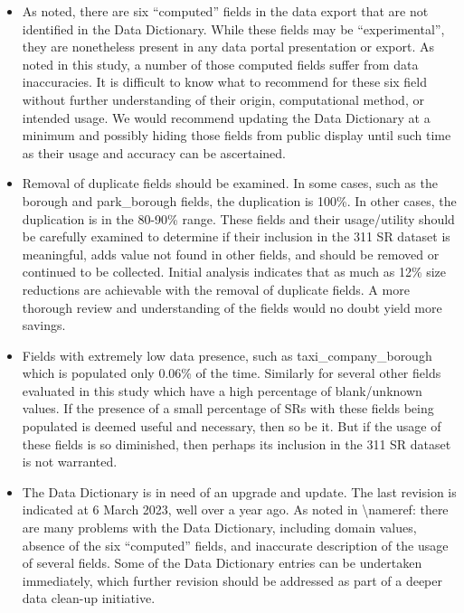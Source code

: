 \documentclass[12pt, titlepage]{article}
\begin{document}
\begin{itemize}
	\item As noted, there are six ``computed'' fields in the data export 
	that are not identified in the Data Dictionary. While these fields may 
	be ``experimental'', they are nonetheless present in any data portal 
	presentation or export. As noted in this study, a number of those 
	computed fields suffer from data inaccuracies. It is difficult to know 
	what to recommend for these six field without further understanding of 
	their origin, computational method, or intended usage. We would 
	recommend updating the Data Dictionary at a minimum and 
	possibly hiding those fields from public display until such time as 
	their usage and accuracy can be ascertained.
	
	\item Removal of duplicate fields should be examined.  In some cases, such 
	as the borough and park\_borough fields, the duplication is 100\%. In 
	other cases, the duplication is in the 80-90\% range. These fields and 
	their usage/utility should be carefully examined to determine if 
	their inclusion in the 311 SR dataset is meaningful, adds value not found 
	in other fields, and should be removed or continued to be collected. Initial 
	analysis indicates that as much as 12\% size reductions are achievable 
	with the removal of duplicate fields. A more thorough review and 
	understanding of the fields would no doubt yield more savings. 
	
	\item Fields with extremely low data presence, such as taxi\_company\_borough 
	which is populated only 0.06\% of the time. Similarly for several other 
	fields evaluated in this study which have a high percentage of blank/unknown 
	values. If the presence of a small percentage of SRs with these fields 
	being populated is deemed useful and necessary, then so be it. But if 
	the usage of these fields is so diminished, then perhaps its inclusion 
	in the 311 SR dataset is not warranted.
	
	\item The Data Dictionary is in need of an upgrade and update. The last 
	revision is indicated at 6 March 2023, well over a year ago. 	As noted 
	in \textbackslash nameref:  there are many 
	problems with the Data Dictionary, including domain values, absence of 
	the six ``computed'' fields, and inaccurate description of the usage of 
	several fields. Some of the Data Dictionary entries can be undertaken 
	immediately, which further revision should be addressed as part of 
	a deeper data clean-up initiative. 
	

\end{itemize}
\end{document}
